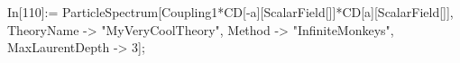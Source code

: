 In[110]:= ParticleSpectrum[Coupling1*CD[-a][ScalarField[]]*CD[a][ScalarField[]], TheoryName -> "MyVeryCoolTheory", Method -> "InfiniteMonkeys", MaxLaurentDepth -> 3]; 